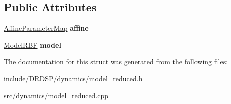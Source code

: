 \subsection*{Public Attributes}
\begin{DoxyCompactItemize}
\item 
\hypertarget{struct_d_r_d_s_p_1_1_model_reduced_a8e8cdc1418a769f687f566f43d76d27e}{\hyperlink{struct_d_r_d_s_p_1_1_affine_parameter_map}{Affine\-Parameter\-Map} {\bfseries affine}}\label{struct_d_r_d_s_p_1_1_model_reduced_a8e8cdc1418a769f687f566f43d76d27e}

\item 
\hypertarget{struct_d_r_d_s_p_1_1_model_reduced_a8e8c5050d7ebc6f7c0d62cdd2fca3401}{\hyperlink{struct_d_r_d_s_p_1_1_model_r_b_f}{Model\-R\-B\-F} {\bfseries model}}\label{struct_d_r_d_s_p_1_1_model_reduced_a8e8c5050d7ebc6f7c0d62cdd2fca3401}

\end{DoxyCompactItemize}


The documentation for this struct was generated from the following files\-:\begin{DoxyCompactItemize}
\item 
include/\-D\-R\-D\-S\-P/dynamics/model\-\_\-reduced.\-h\item 
src/dynamics/model\-\_\-reduced.\-cpp\end{DoxyCompactItemize}
